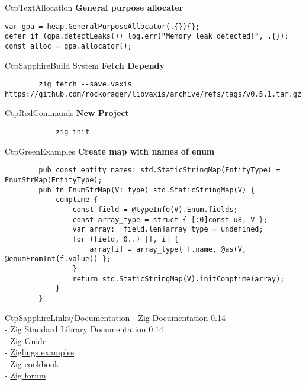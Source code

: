 \documentclass[10pt,a4paper]{article}
\begin{document}
\begin{multicols*}{3}
\begin{mycolorbox}{CtpText}{Allocation}
		\textbf{General purpose allocater}
	\begin{verbatim}
var gpa = heap.GeneralPurposeAllocator(.{}){};
defer if (gpa.detectLeaks()) log.err("Memory leak detected!", .{});
const alloc = gpa.allocator();
	\end{verbatim}
\end{mycolorbox}


\begin{mycolorbox}{CtpSapphire}{Build System}
	\textbf{Fetch Dependy}
	\begin{verbatim}
		zig fetch --save=vaxis https://github.com/rockorager/libvaxis/archive/refs/tags/v0.5.1.tar.gz
	\end{verbatim}
\end{mycolorbox}

\begin{mycolorbox}{CtpRed}{Commands}
		\textbf{New Project}
		\begin{verbatim}
			zig init
		\end{verbatim}
\end{mycolorbox}



\end{multicols*}	
\newpage
\begin{mycolorbox}{CtpGreen}{Examples}
	\textbf{Create map with names of enum}
	\begin{verbatim}
		pub const entity_names: std.StaticStringMap(EntityType) = EnumStrMap(EntityType);
		pub fn EnumStrMap(V: type) std.StaticStringMap(V) {
			comptime {
				const field = @typeInfo(V).Enum.fields;
				const array_type = struct { [:0]const u8, V };
				var array: [field.len]array_type = undefined;
				for (field, 0..) |f, i| {
					array[i] = array_type{ f.name, @as(V, @enumFromInt(f.value)) };
				}
				return std.StaticStringMap(V).initComptime(array);
			}
		}
	\end{verbatim}
\end{mycolorbox}

\begin{mycolorbox}{CtpSapphire}{Links/Documentation}
	- \href{https://ziglang.org/documentation/0.14.0/}{Zig Documentation 0.14}\\
	- \href{https://ziglang.org/documentation/0.14.0/std/}{Zig Standard Library Documentation 0.14}\\
	- \href{https://zig.guide/}{Zig Guide}\\
	- \href{https://codeberg.org/ziglings/exercises/#ziglings}{Ziglings examples}\\
	- \href{https://cookbook.ziglang.cc/}{Zig cookbook}\\
	- \href{https://ziggit.dev/}{Zig forum}\\
\end{mycolorbox}
	
\end{document}

